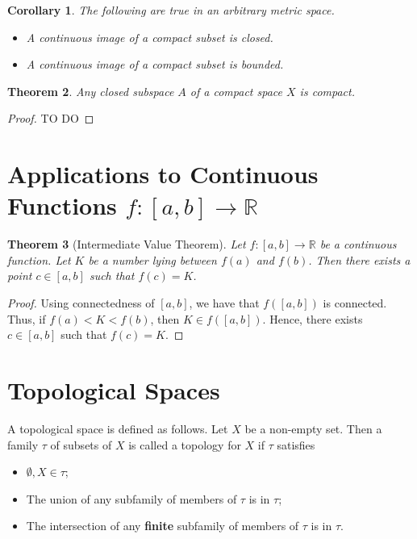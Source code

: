 \documentclass[10pt, oneside, reqno]{amsart}
\theoremstyle{plain}%
\newtheorem{thm}{Theorem}[section]
\newtheorem{cor}[thm]{Corollary}
\theoremstyle{definition}
\theoremstyle{remark}
\newcommand{\R}{\mathbb{R}}
\begin{document}
\begin{cor}
	The following are true in an arbitrary metric space.
	\begin{itemize}
		\item A continuous image of a compact subset is closed.
		\item A continuous image of a compact subset is bounded.
	\end{itemize}
\end{cor}

\begin{thm}
	Any closed subspace $A$ of a compact space $X$ is compact.
\end{thm}

\begin{proof}
	TO DO
\end{proof}


\section{Applications to Continuous Functions $f : [a,b] \rightarrow \R$} %
\label{sec:applications_to_f_a_b_rightarrow_r_}
\begin{thm}[Intermediate Value Theorem]
	Let $f: [a,b] \rightarrow \R$ be a continuous function.  Let $K$ be a number lying between $f(a)$ and $f(b)$.  Then there exists a point $c \in [a,b]$ such that $f(c) = K$.
\end{thm}

\begin{proof}
	Using connectedness of $[a,b]$, we have that $f([a,b])$ is connected.  Thus, if $f(a) < K < f(b)$, then $K \in f([a,b])$.  Hence, there exists $c \in [a,b]$ such that $f(c) = K$.
\end{proof}


\section{Topological Spaces} %
\label{sec:topological_spaces}

A topological space is defined as follows.  Let $X$ be a non-empty set.  Then a family $\tau$ of subsets of $X$ is called a topology for $X$ if $\tau$ satisfies 
\begin{itemize}
	\item $\emptyset, X \in \tau$;
	\item The union of any subfamily of members of $\tau$ is in $\tau$;
	\item The intersection of any \textbf{finite} subfamily of members of $\tau$ is in $\tau$.
\end{itemize}
\end{document}
